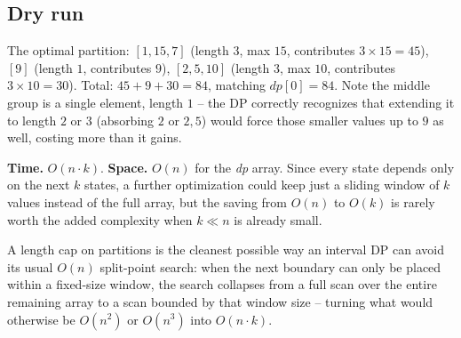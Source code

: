 \subsection*{Dry run}


The optimal partition: $[1,15,7]$ (length $3$, max $15$, contributes
$3\times15=45$), $[9]$ (length $1$, contributes $9$), $[2,5,10]$
(length $3$, max $10$, contributes $3\times10=30$). Total:
$45+9+30=84$, matching $\textit{dp}[0]=84$. Note the middle group is a
single element, length $1$ -- the DP correctly recognizes that
extending it to length $2$ or $3$ (absorbing $2$ or $2,5$) would force
those smaller values up to $9$ as well, costing more than it gains.

\begin{complexitybox}
\textbf{Time.} $O(n \cdot k)$.
\textbf{Space.} $O(n)$ for the \textit{dp} array. Since every state
depends only on the next $k$ states, a further optimization could keep
just a sliding window of $k$ values instead of the full array, but the
saving from $O(n)$ to $O(k)$ is rarely worth the added complexity when
$k \ll n$ is already small.
\end{complexitybox}

\begin{takeawaybox}
A length cap on partitions is the cleanest possible way an interval DP
can avoid its usual $O(n)$ split-point search: when the next boundary
can only be placed within a fixed-size window, the search collapses
from a full scan over the entire remaining array to a scan bounded by
that window size -- turning what would otherwise be $O(n^2)$ or
$O(n^3)$ into $O(n\cdot k)$.
\end{takeawaybox}

